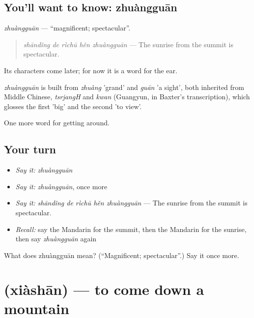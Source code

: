 \subsection*{You'll want to know: zhuàngguān}
\emph{zhuàngguān} — \textquotedblleft{}magnificent; spectacular\textquotedblright{}.

\begin{quote}
\emph{shāndǐng de rìchū hěn zhuàngguān} — The sunrise from the summit is spectacular.
\end{quote}

Its characters come later; for now it is a word for the ear.

\begin{cousinweb}
\emph{zhuàngguān} is built from \emph{zhuàng} 'grand' and \emph{guān} 'a sight', both inherited from Middle Chinese, \emph{tsrjangH} and \emph{kwan} (Guangyun, in Baxter's transcription), which glosses the first 'big' and the second 'to view'.
\end{cousinweb}

\begin{grammarlens}[title={What you've built}]
One more word for getting around.
\end{grammarlens}

\subsection*{Your turn}
\begin{itemize}
\raggedright
  \item \emph{Say it:} \emph{zhuàngguān}
  \item \emph{Say it:} \emph{zhuàngguān}, once more
  \item \emph{Say it:} \emph{shāndǐng de rìchū hěn zhuàngguān} — The sunrise from the summit is spectacular.
  \item \emph{Recall:} say the Mandarin for the summit, then the Mandarin for the sunrise, then say \emph{zhuàngguān} again
\end{itemize}

\begin{tcolorbox}[breakable,colback=teal!4,colframe=teal!35!black,title={Before you move on}]
What does zhuàngguān mean? (\textquotedblleft{}Magnificent; spectacular\textquotedblright{}.) Say it once more.
\end{tcolorbox}
\section[\texorpdfstring{\zh{下山} (xiàshān)}{下山 (xiàshān)}]{ (xiàshān) — to come down a mountain}

